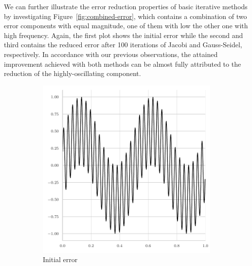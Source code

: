 We can further illustrate the error reduction properties of basic iterative methods by investigating Figure~\ref{fig:combined-error}, which contains a combination of two error components with equal magnitude, one of them with low the other one with high frequency.
Again, the first plot shows the initial error while the second and third contains the reduced error after 100 iterations of Jacobi and Gauss-Seidel, respectively.
In accordance with our previous observations, the attained improvement achieved with both methods can be almost fully attributed to the reduction of the highly-oscillating component.
\begin{figure}
	\begin{subfigure}[t]{0.32\textwidth}
	\centering
		\includegraphics[width=\textwidth]{figures/error_plots//initial_error_jacobi_combined.pdf}
		\caption{Initial error}
\end{subfigure}
\hfill
\begin{subfigure}[t]{0.32\textwidth}
	\centering

\end{subfigure}
\end{figure}
